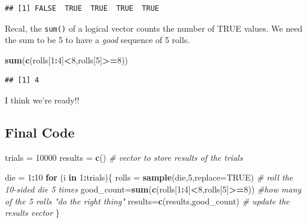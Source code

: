 \documentclass[
]{book}
\newenvironment{Shaded}{\begin{snugshade}}{\end{snugshade}}
\newcommand{\AttributeTok}[1]{\textcolor[rgb]{0.13,0.29,0.53}{#1}}
\newcommand{\CommentTok}[1]{\textcolor[rgb]{0.56,0.35,0.01}{\textit{#1}}}
\newcommand{\ConstantTok}[1]{\textcolor[rgb]{0.56,0.35,0.01}{#1}}
\newcommand{\ControlFlowTok}[1]{\textcolor[rgb]{0.13,0.29,0.53}{\textbf{#1}}}
\newcommand{\DecValTok}[1]{\textcolor[rgb]{0.00,0.00,0.81}{#1}}
\newcommand{\FunctionTok}[1]{\textcolor[rgb]{0.13,0.29,0.53}{\textbf{#1}}}
\newcommand{\NormalTok}[1]{#1}
\newcommand{\OtherTok}[1]{\textcolor[rgb]{0.56,0.35,0.01}{#1}}
\newcommand{\SpecialCharTok}[1]{\textcolor[rgb]{0.81,0.36,0.00}{\textbf{#1}}}
\theoremstyle{definition}
\theoremstyle{definition}
\theoremstyle{definition}
\theoremstyle{definition}
\theoremstyle{remark}
\begin{document}
\begin{verbatim}
## [1] FALSE  TRUE  TRUE  TRUE  TRUE
\end{verbatim}

Recal, the \texttt{sum()} of a logical vector counts the number of TRUE values. We need the sum to be 5 to have a \emph{good} sequence of 5 rolls.

\begin{Shaded}
\begin{Highlighting}[]
\FunctionTok{sum}\NormalTok{(}\FunctionTok{c}\NormalTok{(rolls[}\DecValTok{1}\SpecialCharTok{:}\DecValTok{4}\NormalTok{]}\SpecialCharTok{\textless{}}\DecValTok{8}\NormalTok{,rolls[}\DecValTok{5}\NormalTok{]}\SpecialCharTok{\textgreater{}=}\DecValTok{8}\NormalTok{))}
\end{Highlighting}
\end{Shaded}

\begin{verbatim}
## [1] 4
\end{verbatim}

I think we're ready!!

\subsection{Final Code}\label{final-code}

\begin{Shaded}
\begin{Highlighting}[]
\NormalTok{trials }\OtherTok{=} \DecValTok{10000}
\NormalTok{results }\OtherTok{=} \FunctionTok{c}\NormalTok{() }\CommentTok{\# vector to store results of the trials}

\NormalTok{die }\OtherTok{=} \DecValTok{1}\SpecialCharTok{:}\DecValTok{10}
\ControlFlowTok{for}\NormalTok{ (i }\ControlFlowTok{in} \DecValTok{1}\SpecialCharTok{:}\NormalTok{trials)\{}
\NormalTok{  rolls }\OtherTok{=} \FunctionTok{sample}\NormalTok{(die,}\DecValTok{5}\NormalTok{,}\AttributeTok{replace=}\ConstantTok{TRUE}\NormalTok{) }\CommentTok{\# roll the 10{-}sided die 5 times}
\NormalTok{  good\_count}\OtherTok{=}\FunctionTok{sum}\NormalTok{(}\FunctionTok{c}\NormalTok{(rolls[}\DecValTok{1}\SpecialCharTok{:}\DecValTok{4}\NormalTok{]}\SpecialCharTok{\textless{}}\DecValTok{8}\NormalTok{,rolls[}\DecValTok{5}\NormalTok{]}\SpecialCharTok{\textgreater{}=}\DecValTok{8}\NormalTok{)) }\CommentTok{\#how many of the 5 rolls "do the right thing"}
\NormalTok{  results}\OtherTok{=}\FunctionTok{c}\NormalTok{(results,good\_count) }\CommentTok{\# update the results vector}
\NormalTok{\}}
\end{Highlighting}
\end{Shaded}
\end{document}
